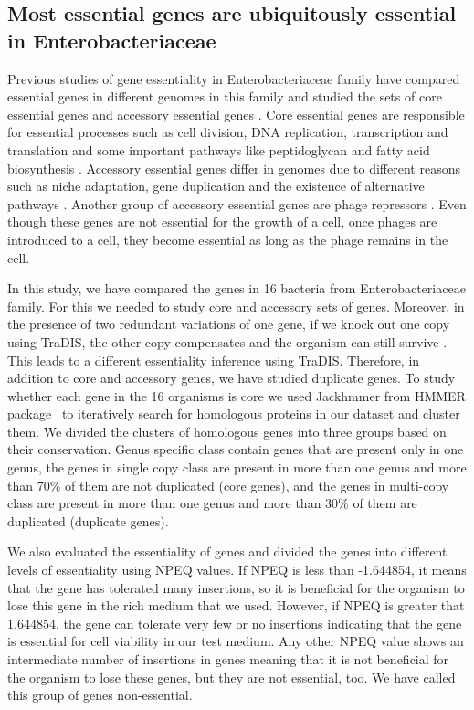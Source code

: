 \documentclass[12pt,letterpaper]{article}
\begin{document}
\subsection{Most essential genes are ubiquitously essential in Enterobacteriaceae}
Previous studies of gene essentiality in Enterobacteriaceae family have compared essential genes in different genomes in this family and studied the sets of core essential genes and accessory essential genes \cite{freed_combining_2016, canals_high-throughput_2012, barquist_comparison_2013}. Core essential genes are responsible for essential processes such as cell division, DNA replication, transcription and translation and some important pathways like peptidoglycan and fatty acid biosynthesis \cite{barquist_comparison_2013}. Accessory essential genes differ in genomes due to different reasons such as niche adaptation, gene duplication and the existence of alternative pathways \cite{freed_combining_2016, canals_high-throughput_2012, barquist_comparison_2013}. Another group of accessory essential genes are phage repressors \cite{barquist_comparison_2013}. Even though these genes are not essential for the growth of a cell, once phages are introduced to a cell, they become essential as long as the phage remains in the cell.

In this study, we have compared the genes in 16 bacteria from Enterobacteriaceae family. For this we needed to study core and accessory sets of genes. Moreover, in the presence of two redundant variations of one gene, if we knock out one copy using TraDIS, the other copy compensates and the organism can still survive \cite{dean_pervasive_2008}. This leads to a different essentiality inference using TraDIS. Therefore, in addition to core and accessory genes, we have studied duplicate genes. To study whether each gene in the 16 organisms is core we used Jackhmmer from HMMER package~\cite{eddy_accelerated_2011} to iteratively search for homologous proteins in our dataset and cluster them. We divided the clusters of homologous genes into three groups based on their conservation. Genus specific class contain genes that are present only in one genus, the genes in single copy class are present in more than one genus and more than 70\% of them are not duplicated (core genes), and  the genes in multi-copy class are present in more than one genus and more than 30\% of them are duplicated (duplicate genes).

We also evaluated the essentiality of genes and divided the genes into different levels of essentiality using NPEQ values. If NPEQ is less than -1.644854, it means that the gene has tolerated many insertions, so it is beneficial for the organism to lose this gene in the rich medium that we used. However, if NPEQ is greater that 1.644854, the gene can tolerate very few or no insertions indicating that the gene is essential for cell viability in our test medium. Any other NPEQ value shows an intermediate number of insertions in genes meaning that it is not beneficial for the organism to lose these genes, but they are not essential, too. We have called this group of genes non-essential.
\end{document}
